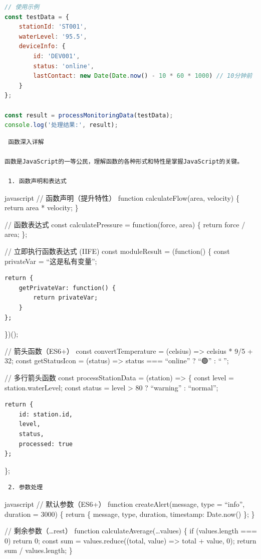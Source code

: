 {\begin{lstlisting}[language=Javascript]
// 使用示例
const testData = {
    stationId: 'ST001',
    waterLevel: '95.5',
    deviceInfo: {
        id: 'DEV001',
        status: 'online',
        lastContact: new Date(Date.now() - 10 * 60 * 1000) // 10分钟前
    }
};

const result = processMonitoringData(testData);
console.log('处理结果:', result);
\end{lstlisting}

\begin{lstlisting}
 函数深入详解

函数是JavaScript的一等公民，理解函数的各种形式和特性是掌握JavaScript的关键。

 1. 函数声明和表达式
\end{lstlisting}

javascript // 函数声明（提升特性） function calculateFlow(area, velocity) \{ return area * velocity; \}

// 函数表达式 const calculatePressure = function(force, area) \{ return force / area; \};

// 立即执行函数表达式 (IIFE) const moduleResult = (function() \{ const privateVar = ``这是私有变量'';

\begin{verbatim}
return {
    getPrivateVar: function() {
        return privateVar;
    }
};
\end{verbatim}

\})();

// 箭头函数（ES6+） const convertTemperature = (celsius) =\textgreater{} celsius * 9/5 + 32; const getStatusIcon = (status) =\textgreater{} status === ``online'' ? ``🟢'' : ``🔴'';

// 多行箭头函数 const processStationData = (station) =\textgreater{} \{ const level = station.waterLevel; const status = level \textgreater{} 80 ? ``warning'' : ``normal'';

\begin{verbatim}
return {
    id: station.id,
    level,
    status,
    processed: true
};
\end{verbatim}

\};

\begin{lstlisting}
 2. 参数处理
\end{lstlisting}

javascript // 默认参数（ES6+） function createAlert(message, type = ``info'', duration = 3000) \{ return \{ message, type, duration, timestamp: Date.now() \}; \}

// 剩余参数（\ldots rest） function calculateAverage(\ldots values) \{ if (values.length === 0) return 0; const sum = values.reduce((total, value) =\textgreater{} total + value, 0); return sum / values.length; \}

}
